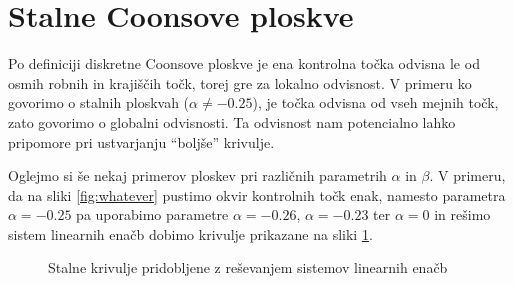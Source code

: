 \documentclass[a4paper,12pt]{article}
\begin{document}
\section{Stalne Coonsove ploskve}
\label{ch:4}

Po definiciji diskretne Coonsove ploskve je ena kontrolna točka odvisna le od osmih 
robnih in krajiščih točk, torej gre za lokalno odvisnost. V primeru ko govorimo o stalnih ploskvah 
($\alpha \neq  -0.25$), je točka odvisna od vseh mejnih točk, zato govorimo 
o globalni odvisnosti. Ta odvisnost nam potencialno lahko pripomore pri ustvarjanju 
``boljše'' krivulje.

Oglejmo si še nekaj primerov ploskev pri različnih parametrih $\alpha$ in $\beta$.
V primeru, da na sliki \ref{fig:whatever} pustimo okvir kontrolnih točk enak,
namesto parametra $\alpha =- 0.25$ pa uporabimo 
parametre $\alpha = -0.26$, $\alpha = -0.23$ ter $\alpha = 0$ in rešimo sistem
linearnih enačb dobimo krivulje prikazane na sliki \ref{fig:coons_pospl}.

\begin{figure}[ht!]
   \centering
   \caption{Stalne krivulje pridobljene z reševanjem sistemov linearnih enačb}
\label{fig:coons_pospl}
\end{figure}
\end{document}
